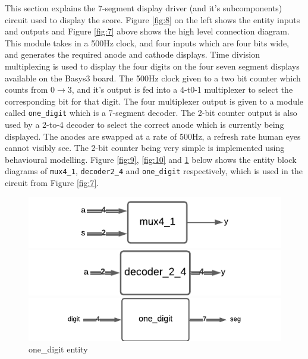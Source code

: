 \documentclass[aps, secnumarabic, balancelastpage, asmath, amssymb, nofootinbib, floatfix,]{revtex4-2}
\begin{document}
{This section explains the 7-segment display driver (and it's subcomponents) circuit used to display the score. Figure \ref{fig:8} on the left shows the entity inputs and outputs and Figure \ref{fig:7} above shows the high level connection diagram. This module takes in a 500Hz clock, and four inputs which are four bits wide, and generates the required anode and cathode displays. Time division multiplexing is used to display the four digits on the four seven segment displays available on the Basys3 board. The 500Hz clock given to a two bit counter which counts from 0$\rightarrow$3, and it's output is fed into a 4-t0-1 multiplexer to select the corresponding bit for that digit. The four multiplexer output is given to a module called \verb|one_digit| which is a 7-segment decoder. The 2-bit counter output is also used by a 2-to-4 decoder to select the correct anode which is currently being displayed. The anodes are swapped at a rate of 500Hz, a refresh rate human eyes cannot visibly see. The 2-bit counter being very simple is implemented using behavioural modelling. Figure \ref{fig:9}, \ref{fig:10} and \ref{fig:11} below shows the entity block diagrams of \verb|mux4_1|, \verb|decoder2_4| and \verb|one_digit| respectively, which is used in the circuit from Figure \ref{fig:7}.

\begin{figure}[!htb]
    \includegraphics[width=\linewidth]{mux4.pdf}
    \caption{\em mux4\_1 entity}\label{fig:9}
  \endminipage\hfill
    \includegraphics[width=\linewidth]{dec.pdf}
    \caption{\em decoder\_2\_4 entity}\label{fig:10}
  \endminipage\hfill
    \includegraphics[width=\linewidth]{one_digit.pdf}
    \caption{one\_digit entity}\label{fig:11}
  \endminipage
  \end{figure}
  
}
\end{document}
